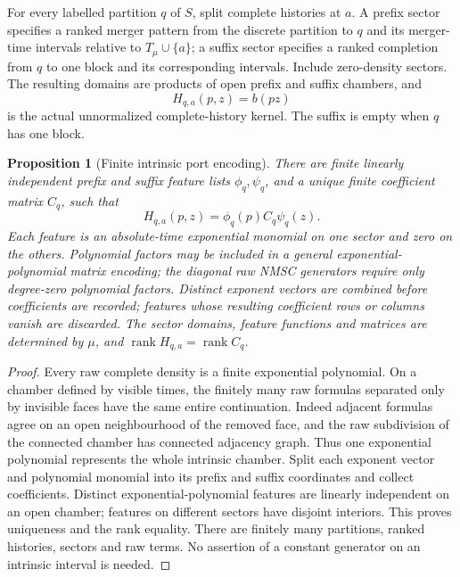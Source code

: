 \documentclass[11pt]{article}
\newtheorem{proposition}[theorem]{Proposition}
\begin{document}
For every labelled partition $q$ of $S$, split complete histories at $a$.  A prefix sector specifies a ranked merger pattern from the discrete partition to $q$ and its merger-time intervals relative to $T_\mu\cup\{a\}$; a suffix sector specifies a ranked completion from $q$ to one block and its corresponding intervals.  Include zero-density sectors.  The resulting domains are products of open prefix and suffix chambers, and
\[
H_{q,a}(p,z)=b(pz)
\]
is the actual unnormalized complete-history kernel.  The suffix is empty when $q$ has one block.

\begin{proposition}[Finite intrinsic port encoding]
\label{prop:intrinsic-port}
There are finite linearly independent prefix and suffix feature lists $\phi_q,\psi_q$, and a unique finite coefficient matrix $C_q$, such that
\begin{equation}
H_{q,a}(p,z)=\phi_q(p)C_q\psi_q(z).
\label{eq:intrinsic-port-kernel}
\end{equation}
Each feature is an absolute-time exponential monomial on one sector and zero on the others.  Polynomial factors may be included in a general exponential-polynomial matrix encoding; the diagonal raw NMSC generators require only degree-zero polynomial factors.  Distinct exponent vectors are combined before coefficients are recorded; features whose resulting coefficient rows or columns vanish are discarded.  The sector domains, feature functions and matrices are determined by $\mu$, and $\operatorname{rank}H_{q,a}=\operatorname{rank}C_q$.
\end{proposition}

\begin{proof}
Every raw complete density is a finite exponential polynomial.  On a chamber defined by visible times, the finitely many raw formulas separated only by invisible faces have the same entire continuation.  Indeed adjacent formulas agree on an open neighbourhood of the removed face, and the raw subdivision of the connected chamber has connected adjacency graph.  Thus one exponential polynomial represents the whole intrinsic chamber.  Split each exponent vector and polynomial monomial into its prefix and suffix coordinates and collect coefficients.  Distinct exponential-polynomial features are linearly independent on an open chamber; features on different sectors have disjoint interiors.  This proves uniqueness and the rank equality.  There are finitely many partitions, ranked histories, sectors and raw terms.  No assertion of a constant generator on an intrinsic interval is needed.
\end{proof}
\end{document}
